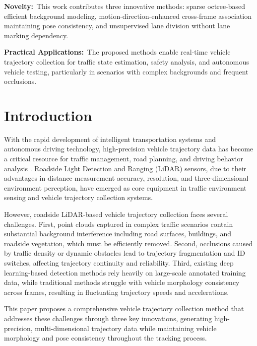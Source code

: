 \documentclass[numbered]{trbunofficial}
\begin{document}
\hfill\break%
\noindent\textbf{Novelty:}~This work contributes three innovative methods: sparse octree-based efficient background modeling, motion-direction-enhanced cross-frame association maintaining pose consistency, and unsupervised lane division without lane marking dependency.

\hfill\break%
\noindent\textbf{Practical Applications:}~The proposed methods enable real-time vehicle trajectory collection for traffic state estimation, safety analysis, and autonomous vehicle testing, particularly in scenarios with complex backgrounds and frequent occlusions.

\newpage

\section{Introduction}\label{sec:intro}

With the rapid development of intelligent transportation systems and autonomous driving technology, high-precision vehicle trajectory data has become a critical resource for traffic management, road planning, and driving behavior analysis \cite{trbwebsite}. Roadside Light Detection and Ranging (LiDAR) sensors, due to their advantages in distance measurement accuracy, resolution, and three-dimensional environment perception, have emerged as core equipment in traffic environment sensing and vehicle trajectory collection systems.

However, roadside LiDAR-based vehicle trajectory collection faces several challenges. First, point clouds captured in complex traffic scenarios contain substantial background interference including road surfaces, buildings, and roadside vegetation, which must be efficiently removed. Second, occlusions caused by traffic density or dynamic obstacles lead to trajectory fragmentation and ID switches, affecting trajectory continuity and reliability. Third, existing deep learning-based detection methods rely heavily on large-scale annotated training data, while traditional methods struggle with vehicle morphology consistency across frames, resulting in fluctuating trajectory speeds and accelerations.

This paper proposes a comprehensive vehicle trajectory collection method that addresses these challenges through three key innovations, generating high-precision, multi-dimensional trajectory data while maintaining vehicle morphology and pose consistency throughout the tracking process.
\end{document}
